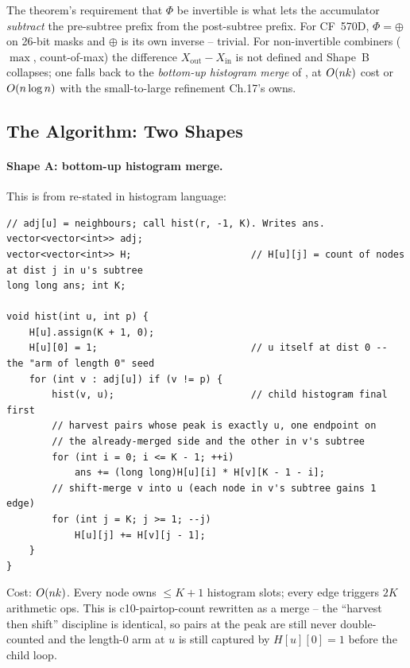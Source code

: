 \begin{insightbox}
The theorem's requirement that $\Phi$ be invertible is what lets the
accumulator \emph{subtract} the pre-subtree prefix from the post-subtree
prefix. For CF~570D, $\Phi=\oplus$ on 26-bit masks and $\oplus$ is its
own inverse -- trivial. For non-invertible combiners ($\max$,
count-of-max) the difference $\mathit{X}_{\mathrm{out}} - \mathit{X}_{\mathrm{in}}$
is not defined and Shape~B collapses; one falls back to the
\emph{bottom-up histogram merge} of , at
$O(nk)$ cost or $O(n\log n)$ with the small-to-large refinement
Ch.17's  owns.
\end{insightbox}

\subsection{The Algorithm: Two Shapes}

\paragraph{Shape A: bottom-up histogram merge.}
This is  from  re-stated in
histogram language:

\begin{lstlisting}[caption={Bottom-up depth histogram merge (CF 161D shape): each child merged after harvest}, label={lst:c10-distk-hist}]
// adj[u] = neighbours; call hist(r, -1, K). Writes ans.
vector<vector<int>> adj;
vector<vector<int>> H;                     // H[u][j] = count of nodes at dist j in u's subtree
long long ans; int K;

void hist(int u, int p) {
    H[u].assign(K + 1, 0);
    H[u][0] = 1;                           // u itself at dist 0 -- the "arm of length 0" seed
    for (int v : adj[u]) if (v != p) {
        hist(v, u);                        // child histogram final first
        // harvest pairs whose peak is exactly u, one endpoint on
        // the already-merged side and the other in v's subtree
        for (int i = 0; i <= K - 1; ++i)
            ans += (long long)H[u][i] * H[v][K - 1 - i];
        // shift-merge v into u (each node in v's subtree gains 1 edge)
        for (int j = K; j >= 1; --j)
            H[u][j] += H[v][j - 1];
    }
}
\end{lstlisting}

\noindent Cost: $O(nk)$. Every node owns $\le K+1$ histogram slots;
every edge triggers $2K$ arithmetic ops. This is \thmref
{c10-pairtop-count} rewritten as a merge -- the ``harvest then shift''
discipline is identical, so pairs at the peak are still never
double-counted and the length-$0$ arm at $u$ is still captured by
$\mathit{H}[u][0]=1$ before the child loop.

